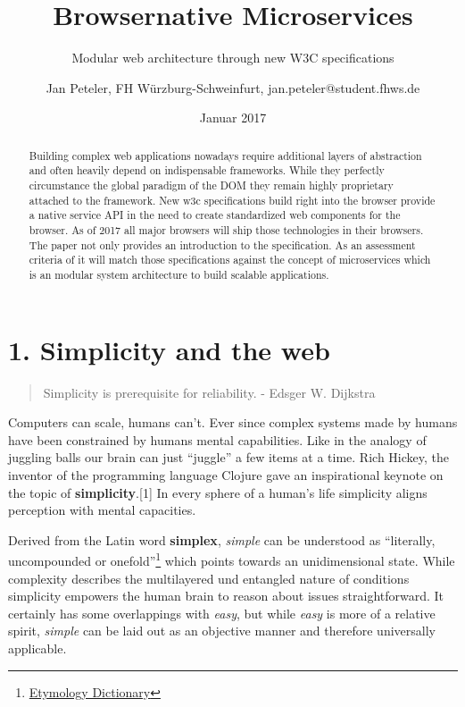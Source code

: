 \documentclass[]{article}
\title{Browsernative Microservices}
\subtitle{Modular web architecture through new W3C specifications}
\author{Jan Peteler, FH Würzburg-Schweinfurt, jan.peteler@student.fhws.de}
\date{Januar 2017}
\begin{document}
\maketitle
\begin{abstract}
Building complex web applications nowadays require additional layers of
abstraction and often heavily depend on indispensable frameworks. While
they perfectly circumstance the global paradigm of the DOM they remain
highly proprietary attached to the framework. New w3c specifications
build right into the browser provide a native service API in the need to
create standardized web components for the browser. As of 2017 all major
browsers will ship those technologies in their browsers. The paper not
only provides an introduction to the specification. As an assessment
criteria of it will match those specifications against the concept of
microservices which is an modular system architecture to build scalable
applications.
\end{abstract}

{
\setcounter{tocdepth}{3}
\tableofcontents
}
\section{1. Simplicity and the web}\label{simplicity-and-the-web}

\begin{quote}
Simplicity is prerequisite for reliability. - Edsger W. Dijkstra
\end{quote}

Computers can scale, humans can't. Ever since complex systems made by
humans have been constrained by humans mental capabilities. Like in the
analogy of juggling balls our brain can just ``juggle'' a few items at a
time. Rich Hickey, the inventor of the programming language Clojure gave
an inspirational keynote on the topic of \textbf{simplicity}.{[}1{]} In
every sphere of a human's life simplicity aligns perception with mental
capacities.

Derived from the Latin word \textbf{simplex}, \emph{simple} can be
understood as ``literally, uncompounded or onefold''\footnote{\href{http://www.etymonline.com/index.php?term=simple}{Etymology
  Dictionary}} which points towards an unidimensional state. While
complexity describes the multilayered und entangled nature of conditions
simplicity empowers the human brain to reason about issues
straightforward. It certainly has some overlappings with \emph{easy},
but while \emph{easy} is more of a relative spirit, \emph{simple} can be
laid out as an objective manner and therefore universally applicable.
\end{document}
